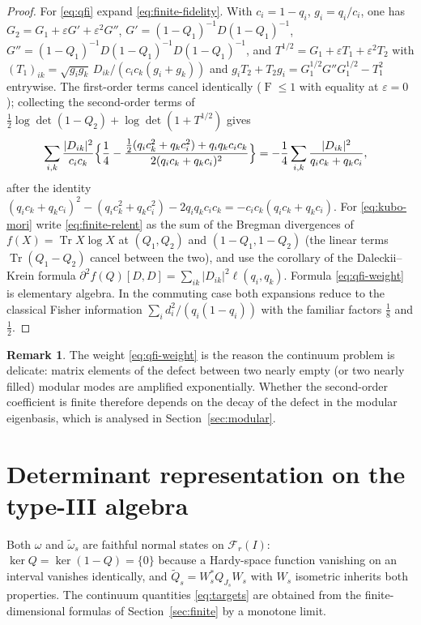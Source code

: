 \documentclass[11pt]{article}
\theoremstyle{accent}
\theoremstyle{definition}
\newtheorem{remark}[theorem]{Remark}
\newcommand{\cF}{\mathcal{F}}
\newcommand{\Tr}{\operatorname{Tr}}
\newcommand{\eps}{\varepsilon}
\newcommand{\Fid}{\operatorname{F}}
\begin{document}
\begin{proof}
For \eqref{eq:qfi} expand \eqref{eq:finite-fidelity}.  With \(c_i=1-q_i\), \(g_i=q_i/c_i\), one has \(G_2=G_1+\eps G'+\eps^2G''\), \(G'=(1-Q_1)^{-1}D(1-Q_1)^{-1}\), \(G''=(1-Q_1)^{-1}D(1-Q_1)^{-1}D(1-Q_1)^{-1}\), and \(T^{1/2}=G_1+\eps T_1+\eps^2T_2\) with \((T_1)_{ik}=\sqrt{g_ig_k}\,D_{ik}/(c_ic_k(g_i+g_k))\) and \(g_iT_2+T_2g_i=G_1^{1/2}G''G_1^{1/2}-T_1^2\) entrywise.
  The first-order terms cancel identically (\(\Fid\le1\) with equality at \(\eps=0\)); collecting the second-order terms of \(\tfrac12\log\det(1-Q_2)+\log\det(1+T^{1/2})\) gives
\begin{align*}
 &\sum_{i,k}\frac{|D_{ik}|^2}{c_ic_k}\Bigl\{\frac14-\frac{\tfrac12(q_ic_k^2+q_kc_i^2)+q_iq_kc_ic_k}{2(q_ic_k+q_kc_i)^2}\Bigr\}
 =-\frac14\sum_{i,k}\frac{|D_{ik}|^2}{q_ic_k+q_kc_i},
\end{align*}
after the identity \((q_ic_k+q_kc_i)^2-(q_ic_k^2+q_kc_i^2)-2q_iq_kc_ic_k=-c_ic_k(q_ic_k+q_kc_i)\).  For \eqref{eq:kubo-mori} write \eqref{eq:finite-relent} as the sum of the Bregman divergences of \(f(X)=\Tr X\log X\) at \((Q_1,Q_2)\) and \((1-Q_1,1-Q_2)\) (the linear terms \(\Tr(Q_1-Q_2)\) cancel between the two), and use the corollary of the Daleckii--Krein formula \(\partial^2f(Q)[D,D]=\sum_{ik}|D_{ik}|^2\ell(q_i,q_k)\).  Formula \eqref{eq:qfi-weight} is elementary algebra.  In the commuting case both expansions reduce to the classical Fisher information \(\sum_id_i^2/(q_i(1-q_i))\) with the familiar factors \(\tfrac18\) and \(\tfrac12\).
\end{proof}

\begin{remark}
The weight \eqref{eq:qfi-weight} is the reason the continuum problem is delicate: matrix elements of the defect between two nearly empty (or two nearly filled) modular modes are amplified exponentially.  Whether the second-order coefficient is finite therefore depends on the decay of the defect in the modular eigenbasis, which is analysed in Section~\ref{sec:modular}.
\end{remark}

\section{Determinant representation on the type-III algebra}\label{sec:infinite}

Both \(\omega\) and \(\widetilde\omega_s\) are faithful normal states on \(\cF_r(I)\): \(\ker Q=\ker(1-Q)=\{0\}\) because a Hardy-space function vanishing on an interval vanishes identically, and \(\widetilde Q_s=W_s^*Q_{J_s}W_s\) with \(W_s\) isometric inherits both properties.  The continuum quantities \eqref{eq:targets} are obtained from the finite-dimensional formulas of Section~\ref{sec:finite} by a monotone limit.
\end{document}
